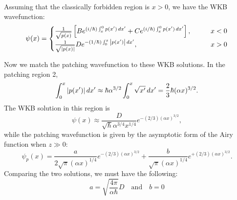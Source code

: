 \documentclass{book}
\theoremstyle{definition}
\newcommand{\al}{\alpha}
\newcommand{\f}[2]{\frac{#1}{#2}}
\newcommand{\lb}{\left[}
\newcommand{\rb}{\right]}
\begin{document}
Assuming that the classically forbidden region is $x>0$, we have the WKB wavefunction:
\begin{align*}
\psi(x) = 
\begin{cases}
\f{1}{\sqrt{p(x)}} \lb Be^{(i/\hbar) \int_x^0 p(x')\,dx'} + C e^{(i/\hbar) \int_x^0 p(x')\,dx'}  \rb, &\quad\quad x < 0 \\
\f{1}{\sqrt{\abs{p(x)}} }  De^{-(1/\hbar)\int_0^x \abs{p(x')}\,dx'}, &\quad\quad x > 0
\end{cases}
\end{align*}


Now we match the patching wavefunction to these WKB solutions. In the patching region 2, 
\begin{equation*}
\int_0^x \abs{p(x')}\,dx' \approx \hbar \al^{3/2}\int^x_0 \sqrt{x'}\,dx' = \f{2}{3}\hbar (\al x)^{3/2}.
\end{equation*}
The WKB solution in this region is 
\begin{equation*}
\psi(x) \approx \f{D}{\sqrt{\hbar} \al^{3/4} x^{1/4} } e^{-(2/3)(\al x)^{3/2}},
\end{equation*}
while the patching wavefunction is given by the asymptotic form of the Airy function when $z \gg 0$: 
\begin{equation*}
\psi_p(x) = \f{a}{2\sqrt{\pi} (\al x)^{1/4}} e^{-(2/3) (\al x)^{3/2}} + \f{b}{\sqrt{\pi} (\al x)^{1/4}} e^{+(2/3) (\al x)^{3/2}}.
\end{equation*}
Comparing the two solutions, we must have the following:
\begin{equation*}
\boxed{a = \sqrt{\f{4\pi}{\al \hbar} } D \quad \text{and} \quad b =0}
\end{equation*}
\end{document}

